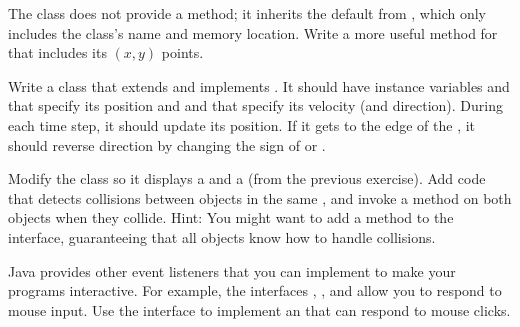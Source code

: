 \begin{exercise}
The  class does not provide a  method; it inherits the default  from , which only includes the class's name and memory location.
Write a more useful  method for  that includes its $(x, y)$ points.
\end{exercise}


\begin{exercise}
Write a class  that extends  and implements .
It should have instance variables  and  that specify its position and  and  that specify its velocity (and direction).
During each time step, it should update its position.
If it gets to the edge of the , it should reverse direction by changing the sign of  or .
\end{exercise}


\begin{exercise}
Modify the  class so it displays a  and a  (from the previous exercise).
Add code that detects collisions between  objects in the same , and invoke a method on both objects when they collide.
Hint: You might want to add a method to the  interface, guaranteeing that all  objects know how to handle collisions.
\end{exercise}


\begin{exercise}
Java provides other event listeners that you can implement to make your programs interactive.
For example, the interfaces , , and  allow you to respond to mouse input.
Use the  interface to implement an  that can respond to mouse clicks.
\end{exercise}
